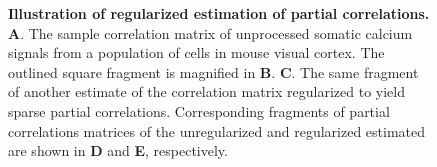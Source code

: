\documentclass[10pt]{article}
\begin{document}
\begin{figure}[!ht]
    \begin{center}
    \end{center}
    \caption{{\bf Illustration of regularized estimation of partial correlations.}
        {\bf A}. The sample correlation matrix of unprocessed somatic calcium signals from a population of cells in mouse visual cortex.
        The outlined square fragment is magnified in {\bf B}.
        {\bf C}. The same fragment of another estimate of the correlation matrix regularized to yield sparse partial correlations.
        Corresponding fragments of partial correlations matrices of the unregularized and regularized estimated are shown in {\bf D} and {\bf E}, respectively.
    }
    \label{fig:01}
\end{figure}
\end{document}
